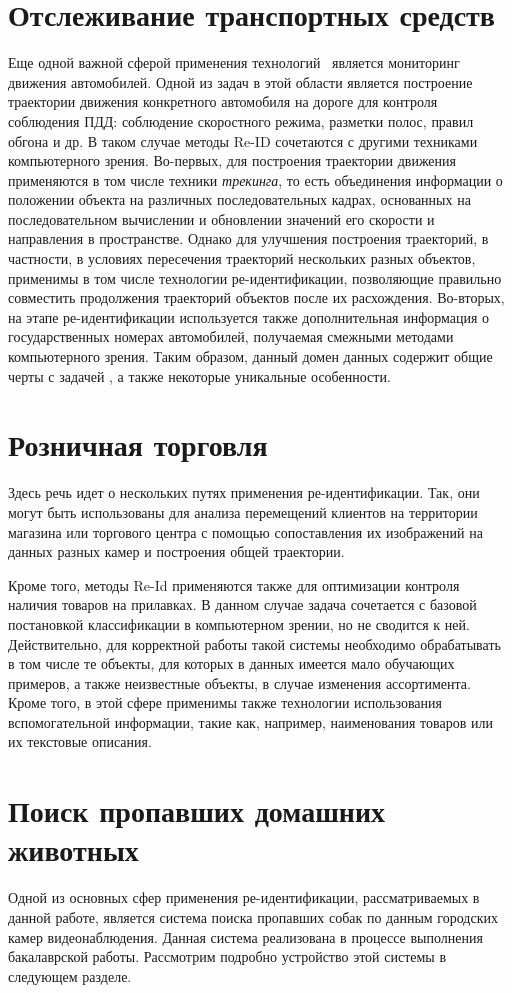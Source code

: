 \section{Отслеживание транспортных средств}

Еще одной важной сферой применения технологий \reid\ является мониторинг движения автомобилей. Одной из задач в этой области является построение траектории движения конкретного автомобиля на дороге для контроля соблюдения ПДД: соблюдение скоростного режима, разметки полос, правил обгона и др. В таком случае методы Re-ID сочетаются с другими техниками компьютерного зрения. Во-первых, для построения траектории движения применяются в том числе техники \textit{трекинга}, то есть объединения информации о положении объекта на различных последовательных кадрах, основанных на последовательном вычислении и обновлении значений его скорости и направления в пространстве. Однако для улучшения построения траекторий, в частности, в условиях пересечения траекторий нескольких разных объектов, применимы в том числе технологии ре-идентификации, позволяющие правильно совместить продолжения траекторий объектов после их расхождения. Во-вторых, на этапе ре-идентификации используется также дополнительная информация о государственных номерах автомобилей, получаемая смежными методами компьютерного зрения. Таким образом, данный домен данных содержит общие черты с задачей \reid, а также некоторые уникальные особенности.


\section{Розничная торговля}

Здесь речь идет о нескольких путях применения ре-идентификации. Так, они могут быть использованы для анализа перемещений клиентов на территории магазина или торгового центра с помощью сопоставления их изображений на данных разных камер и построения общей траектории.

Кроме того, методы Re-Id применяются также для оптимизации контроля наличия товаров на прилавках. В данном случае задача сочетается с базовой постановкой классификации в компьютерном зрении, но не сводится к ней. Действительно, для корректной работы такой системы необходимо обрабатывать в том числе те объекты, для которых в данных имеется мало обучающих примеров, а также неизвестные объекты, в случае изменения ассортимента. Кроме того, в этой сфере применимы также технологии использования вспомогательной информации, такие как, например, наименования товаров или их текстовые описания.


\section{Поиск пропавших домашних животных}

Одной из основных сфер применения ре-идентификации, рассматриваемых в данной работе, является система поиска пропавших собак по данным городских камер видеонаблюдения. Данная система реализована в процессе выполнения бакалаврской работы. Рассмотрим подробно устройство этой системы в следующем разделе.



\endinput